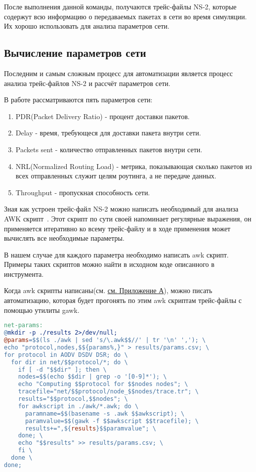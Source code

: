 После выполнения данной команды, получаются трейс-файлы NS-2, которые содержут всю информацию о передаваемых пакетах в сети во время симуляции. Их хорошо использовать для анализа параметров сети.

\subsection*{Вычисление параметров сети}

Последним и самым сложным процесс для автоматизации является процесс анализа трейс-файлов NS-2 и рассчёт параметров сети.

В работе рассматриваются пять параметров сети:

\begin{enumerate}
  \item PDR(Packet Delivery Ratio) - процент доставки пакетов.
  \item Delay - время, требующеся для доставки пакета внутри сети.
  \item Packets sent - количество отправленных пакетов внутри сети.
  \item NRL(Normalized Routing Load) - метрика, показывающая сколько пакетов из всех отправленных служит целям роутинга, а не передаче данных.
  \item Throughput - пропускная способность сети.
\end{enumerate}

Зная как устроен трейс-файл NS-2 можно написать необходимый для анализа AWK скрипт~\cite{ns2_awk_scripts}. Этот скрипт по сути своей напоминает регулярные выражения, он применяется итеративно ко всему трейс-файлу и в ходе применения может вычислять все необходимые параметры.

В нашем случае для каждого параметра необходимо написать awk скрипт. Примеры таких скриптов можно найти в исходном коде описанного в ~\cite{ns2_analisys_tools} инструмента.

Когда awk скрипты написаны(см. \hyperlink{ap_awk}{см. Приложение А}), можно писать автоматизацию, которая будет прогонять по этим awk скриптам трейс-файлы с помощью утилиты gawk.

\begin{lstlisting}[language=make, style=mystyle, caption=Makefile для подсчёта параметров сети]
net-params:
@mkdir -p ./results 2>/dev/null;
@params=$$(ls ./awk | sed 's/\.awk$$//' | tr '\n' ','); \
echo "protocol,nodes,$${params%,}" > results/params.csv; \
for protocol in AODV DSDV DSR; do \
  for dir in net/$$protocol/*; do \
    if [ -d "$$dir" ]; then \
    nodes=$$(echo $$dir | grep -o '[0-9]*'); \
    echo "Computing $$protocol for $$nodes nodes"; \
    tracefile="net/$$protocol/node_$$nodes/trace.tr"; \
    results="$$protocol,$$nodes"; \
    for awkscript in ./awk/*.awk; do \
      paramname=$$(basename -s .awk $$awkscript); \
      paramvalue=$$(gawk -f $$awkscript $$tracefile); \
      results+=",${results}$$paramvalue"; \
    done; \
    echo "$$results" >> results/params.csv; \
    fi \
  done \
done;
\end{lstlisting}

